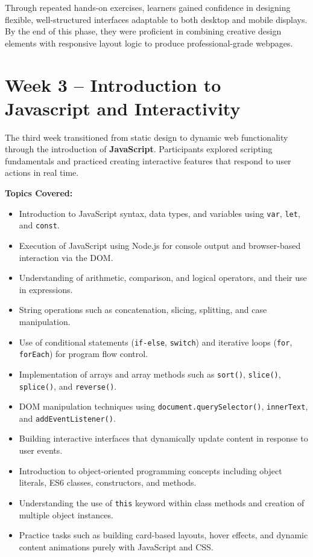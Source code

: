 \documentclass[a4paper,12pt,oneside]{report}
\numberwithin{equation}{chapter}
\numberwithin{figure}{chapter}
\numberwithin{table}{chapter}
\begin{document}
Through repeated hands-on exercises, learners gained confidence in designing flexible, well-structured interfaces adaptable to both desktop and mobile displays. By the end of this phase, they were proficient in combining creative design elements with responsive layout logic to produce professional-grade webpages.

\vspace{5mm}
\noindent
\section{Week 3 – Introduction to Javascript and Interactivity}

The third week transitioned from static design to dynamic web functionality through the introduction of \textbf{JavaScript}. Participants explored scripting fundamentals and practiced creating interactive features that respond to user actions in real time.

\textbf{Topics Covered:}
\begin{itemize}
    \item Introduction to JavaScript syntax, data types, and variables using \texttt{var}, \texttt{let}, and \texttt{const}.
    \item Execution of JavaScript using Node.js for console output and browser-based interaction via the DOM.
    \item Understanding of arithmetic, comparison, and logical operators, and their use in expressions.
    \item String operations such as concatenation, slicing, splitting, and case manipulation.
    \item Use of conditional statements (\texttt{if-else}, \texttt{switch}) and iterative loops (\texttt{for}, \texttt{forEach}) for program flow control.
    \item Implementation of arrays and array methods such as \texttt{sort()}, \texttt{slice()}, \texttt{splice()}, and \texttt{reverse()}.
    \item DOM manipulation techniques using \texttt{document.querySelector()}, \texttt{innerText}, and \texttt{addEventListener()}.
    \item Building interactive interfaces that dynamically update content in response to user events.
    \item Introduction to object-oriented programming concepts including object literals, ES6 classes, constructors, and methods.
    \item Understanding the use of \texttt{this} keyword within class methods and creation of multiple object instances.
    \item Practice tasks such as building card-based layouts, hover effects, and dynamic content animations purely with JavaScript and CSS.
\end{itemize}
\end{document}
